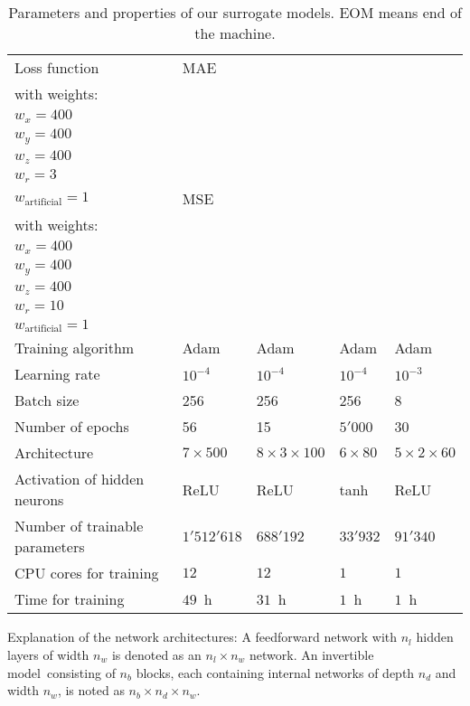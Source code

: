\documentclass[a4paper, 12pt, version-1-compatibility]{article}
\def\invertiblemodel{invertible model}
\newcommand{\eqnref}[1]{Eq.~\ref{#1}}
\begin{document}
\begin{table}[h!]
{\begin{tabular}{lllll}
         Loss function                    & MAE & \makecell[tl]{$\mathcal{L}_\mathrm{inv}$ (\eqnref{equ:inv_loss})\\with weights:\\ $w_x = 400$\\ $w_y = 400$\\ $w_z = 400$\\ $w_r = 3$\\ $w_\mathrm{artificial} = 1$} & MSE & \makecell[tl]{$\mathcal{L}_\mathrm{inv}$ (\eqnref{equ:inv_loss})\\with weights:\\ $w_x = 400$\\ $w_y = 400$\\ $w_z = 400$\\ $w_r = 10$\\ $w_\mathrm{artificial} = 1$} \\
         Training algorithm               & Adam & Adam & Adam & Adam\\
         Learning rate                    & $10^{-4}$ & $10^{-4}$ & $10^{-4}$ & $10^{-3}$ \\
         Batch size                       & 256 & 256 & 256 & 8 \\
         Number of epochs                 & 56  & 15  & $5'000$ & 30 \\
         Architecture                     & $7 \times 500$ & $8 \times 3 \times 100$ & $6 \times 80$ & $5 \times 2 \times 60$ \\
         Activation of hidden neurons     & ReLU & ReLU & tanh & ReLU\\
         Number of trainable parameters   & $1'512'618$ & $688'192$ & $33'932$ & $91'340$ \\ %
         CPU cores for training           & $12$ & $12$ & $1$ & $1$\\
         Time for training                & $49$~h & $31$~h & $1$~h & $1$~h\\ 
         \bottomrule
    \end{tabular}}
    \caption{Parameters and properties of our surrogate models. EOM means end of the machine.}
    \label{tab:parameters}
\end{table}
Explanation of the network architectures: A feedforward network with $n_l$ hidden layers of width $n_w$ is denoted as an $n_l \times n_w$ network. An \invertiblemodel\ consisting of $n_b$ blocks, each containing internal networks of depth $n_d$ and width $n_w$, is noted as $n_b \times n_d \times n_w$.
\end{document}

